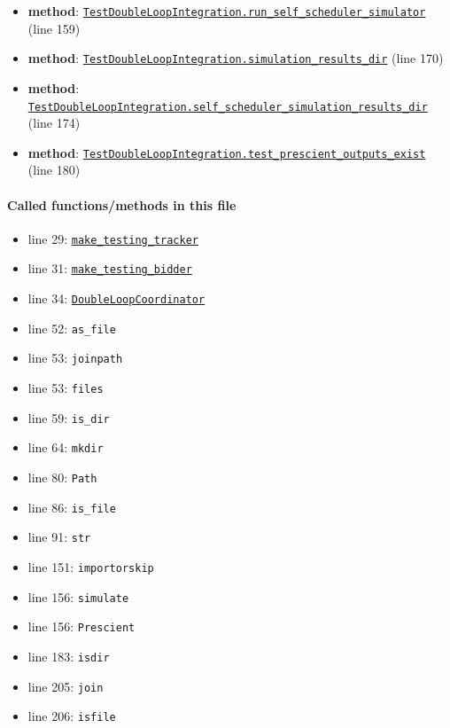\documentclass[11pt]{report}
\begin{document}
\begin{itemize}[leftmargin=*]
  \item \textbf{method}: \hyperref[def:tests-test_integration.py:TestDoubleLoopIntegration.run_self_scheduler_simulator:L159]{\texttt{TestDoubleLoopIntegration.run\_self\_scheduler\_simulator}} (line 159)
  \item \textbf{method}: \hyperref[def:tests-test_integration.py:TestDoubleLoopIntegration.simulation_results_dir:L170]{\texttt{TestDoubleLoopIntegration.simulation\_results\_dir}} (line 170)
  \item \textbf{method}: \hyperref[def:tests-test_integration.py:TestDoubleLoopIntegration.self_scheduler_simulation_results_dir:L174]{\texttt{TestDoubleLoopIntegration.self\_scheduler\_simulation\_results\_dir}} (line 174)
  \item \textbf{method}: \hyperref[def:tests-test_integration.py:TestDoubleLoopIntegration.test_prescient_outputs_exist:L180]{\texttt{TestDoubleLoopIntegration.test\_prescient\_outputs\_exist}} (line 180)
\end{itemize}
\paragraph{Called functions/methods in this file}
\begin{itemize}[leftmargin=*]
  \item line 29: \hyperref[def:tests-util.py:make_testing_tracker:L351]{\texttt{make\_testing\_tracker}}
  \item line 31: \hyperref[def:tests-util.py:make_testing_bidder:L373]{\texttt{make\_testing\_bidder}}
  \item line 34: \hyperref[def:coordinator.py:DoubleLoopCoordinator:L30]{\texttt{DoubleLoopCoordinator}}
  \item line 52: \texttt{as\_file}
  \item line 53: \texttt{joinpath}
  \item line 53: \texttt{files}
  \item line 59: \texttt{is\_dir}
  \item line 64: \texttt{mkdir}
  \item line 80: \texttt{Path}
  \item line 86: \texttt{is\_file}
  \item line 91: \texttt{str}
  \item line 151: \texttt{importorskip}
  \item line 156: \texttt{simulate}
  \item line 156: \texttt{Prescient}
  \item line 183: \texttt{isdir}
  \item line 205: \texttt{join}
  \item line 206: \texttt{isfile}
\end{itemize}
\end{document}
